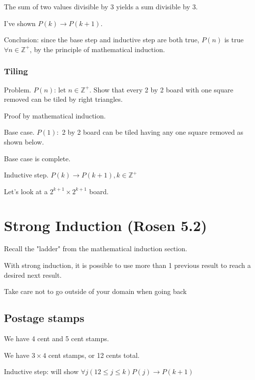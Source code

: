 \documentclass[english,openany]{book}
\begin{document}
    The sum of two values divisible by 3 yields a sum divisible by 3.

    I've shown $P(k) \rightarrow P(k+1)$.

    Conclusion: since the base step and inductive step are both true, $P(n)$ is true $\forall n \in \mathbb Z^+$, by the principle of mathematical induction.\\

    \subsubsection{Tiling}

    Problem. $P(n)$: let $n \in \mathbb Z^+$. Show that every 2 by 2 board with one square removed can be tiled by right triangles.

    Proof by mathematical induction.

    Base case. $P(1): $ 2 by 2 board can be tiled having any one square removed as shown below.


    Base case is complete.

    Inductive step. $P(k) \rightarrow P(k+1), k \in \mathbb Z^+$

    Let's look at a $2^{k+1} \times 2^{k+1}$ board.


    \section{Strong Induction (Rosen 5.2)}

    Recall the "ladder" from the mathematical induction section.

    With strong induction, it is possible to use more than 1 previous result to reach a desired next result.

    Take care not to go outside of your domain when going back

    \subsection{Postage stamps}


    We have 4 cent and 5 cent stamps.

    We have $3 \times 4$ cent stamps, or 12 cents total.

    Inductive step: will show $\forall j (12 \leq j \leq k) P(j) \rightarrow P(k+1)$
\end{document}
